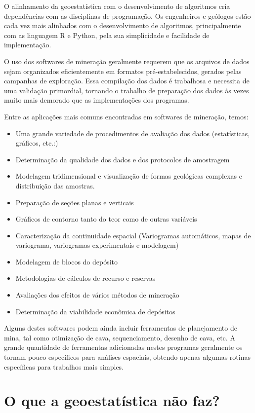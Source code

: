 O alinhamento da geoestatística com o desenvolvimento de algoritmos cria dependências com as disciplinas de programação. Os engenheiros e geólogos estão cada vez mais alinhados com o desenvolvimento de algoritmos, principalmente com as linguagem R e Python, pela sua simplicidade e facilidade de implementação.

O uso dos softwares de mineração geralmente requerem que os arquivos de dados sejam organizados eficientemente em formatos pré-estabelecidos, gerados pelas campanhas de exploração.  Essa compilação dos dados é trabalhosa e necessita de uma validação primordial, tornando o trabalho de preparação dos dados às vezes muito mais demorado que as implementações dos programas.  

Entre as aplicações mais comuns encontradas em softwares de mineração, temos:

\begin{itemize}
\item Uma grande variedade de procedimentos de avaliação dos dados (estatísticas, gráficos, etc.:)
\item Determinação da qualidade dos dados e dos protocolos de amostragem
\item Modelagem tridimensional e visualização de formas geológicas complexas e distribuição das amostras.
\item Preparação de seções planas e verticais 
\item Gráficos de contorno tanto do teor como de outras variáveis 
\item Caracterização da continuidade espacial (Variogramas automáticos, mapas de variograma, variogramas experimentais e modelagem)
\item Modelagem de blocos do depósito
\item Metodologias de cálculos de recurso e reservas
\item Avaliações dos efeitos de vários métodos de mineração
\item Determinação da viabilidade econômica de depósitos
\end{itemize}

Alguns destes softwares podem ainda incluir ferramentas de planejamento de mina, tal como otimização de cava, sequenciamento, desenho de cava, etc. A grande quantidade de ferramentas adicionadas nestes programas geralmente os tornam pouco específicos para análises espaciais, obtendo apenas algumas rotinas específicas para trabalhos mais simples. 


\section{O que a geoestatística não faz?} 

